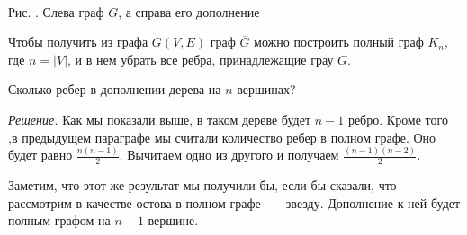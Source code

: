 \begin{center}
\;\ \;\ \;\ \;\ \;\ \;\ \;\ \;\ \;\ \;\ \;\ \;\ \;\
\newline
\newline
	\small Рис. \images. Слева граф $G$, а справа его дополнение
\end{center}

	Чтобы получить из графа $G(V, E)$ граф $\overline{G}$ можно построить полный граф $K_n$, где $n = |V|$, и в нем убрать все ребра, принадлежащие грау $G$.

\begin{example}
	Сколько ребер в дополнении дерева на $n$ вершинах?
	
	\emph{Решение.} Как мы показали выше, в таком дереве будет $n-1$ ребро. Кроме того ,в предыдущем параграфе мы считали количество ребер в полном графе. Оно будет равно $\frac{n(n-1)}{2}$. Вычитаем одно из другого и получаем $\frac{(n-1)(n-2)}{2}$.
	
	Заметим, что этот же результат мы получили бы, если бы сказали, что рассмотрим в качестве остова в полном графе~---~звезду. Дополнение к ней будет полным графом на $n-1$ вершине.
\end{example}

